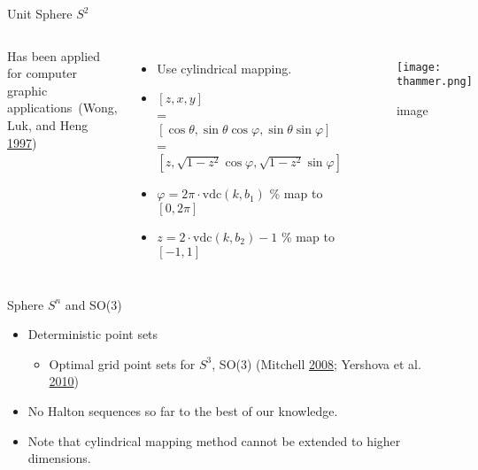 \documentclass[10pt,ignorenonframetext,serif,onlymath]{beamer}
\providecommand{\tightlist}{%
  \setlength{\itemsep}{0pt}\setlength{\parskip}{0pt}}
\begin{document}
\begin{frame}{Unit Sphere \(S^2\)}
\protect\hypertarget{unit-sphere-s2}{}

\begin{columns}


Has been applied for computer graphic applications~(Wong, Luk, and Heng
\protect\hyperlink{ref-wong1997sampling}{1997})

\begin{itemize}
\item
  Use cylindrical mapping.
\item
  \([z, x, y]\)\\
  = \([\cos\theta, \sin\theta\cos\varphi, \sin\theta\sin\varphi]\)\\
  = \([z, \sqrt{1-z^2}\cos\varphi, \sqrt{1-z^2}\sin\varphi]\)
\item
  \(\varphi = 2\pi\cdot\mathrm{vdc}(k,b_1)\) \% map to \([0,2\pi]\)
\item
  \(z = 2\cdot\mathrm{vdc}(k,b_2) - 1\) \% map to \([-1,1]\)
\end{itemize}


\begin{figure}
\centering
\texttt{[image: thammer.png]}
\caption{image}
\end{figure}

\end{columns}

\end{frame}

\begin{frame}{Sphere \(S^n\) and SO(3)}
\protect\hypertarget{sub:sphere_s_n_and_so_3_}{}

\begin{itemize}
\item
  Deterministic point sets

  \begin{itemize}
  \tightlist
  \item
    Optimal grid point sets for \(S^3\), SO(3) (Mitchell
    \protect\hyperlink{ref-mitchell2008sampling}{2008}; Yershova et al.
    \protect\hyperlink{ref-yershova2010generating}{2010})
  \end{itemize}
\item
  No Halton sequences so far to the best of our knowledge.
\item
  Note that cylindrical mapping method cannot be extended to higher
  dimensions.
\end{itemize}

\end{frame}
\end{document}
